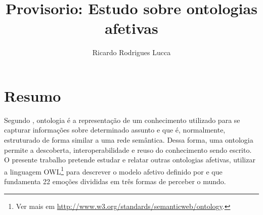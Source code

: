 \documentclass[12pt]{sa}
\title{Provisorio: Estudo sobre ontologias afetivas}
\author{Ricardo Rodrigues Lucca}
\newcommand{\citet}{\citeonline}
\begin{document}
\maketitle


%
%
%
%


\section{Resumo}
Segundo \citet{ontoly2004Approach}, ontologia é a representação de um
conhecimento utilizado para se capturar informações sobre determinado assunto
e que é, normalmente, estruturado de forma similar a uma rede semântica. Dessa
forma, uma ontologia permite a descoberta, interoperabilidade e reuso do
conhecimento sendo escrito.
%
O presente trabalho pretende estudar e relatar outras ontologias afetivas,
utilizar a linguagem OWL\footnote{Ver mais em
\url{http://www.w3.org/standards/semanticweb/ontology}.} para descrever o
modelo afetivo definido por \citet{ortony1988cse} e que fundamenta 22 emoções
divididas em três formas de perceber o mundo.
\end{document}
